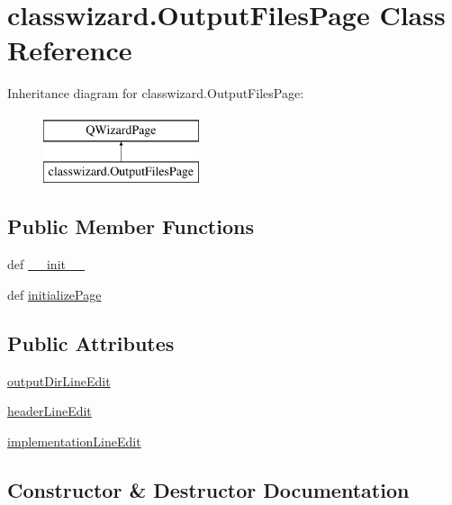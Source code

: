 \hypertarget{classclasswizard_1_1OutputFilesPage}{}\section{classwizard.\+Output\+Files\+Page Class Reference}
\label{classclasswizard_1_1OutputFilesPage}
Inheritance diagram for classwizard.\+Output\+Files\+Page\+:\begin{figure}[H]
\begin{center}
\leavevmode
\includegraphics[height=2.000000cm]{classclasswizard_1_1OutputFilesPage}
\end{center}
\end{figure}
\subsection*{Public Member Functions}
\begin{DoxyCompactItemize}
\item 
def \hyperlink{classclasswizard_1_1OutputFilesPage_a62190fa4f1f63361b802c6c979ab4219}{\+\_\+\+\_\+init\+\_\+\+\_\+}
\item 
def \hyperlink{classclasswizard_1_1OutputFilesPage_a03937d827ca14f5ab7d8fcd594fc55bd}{initialize\+Page}
\end{DoxyCompactItemize}
\subsection*{Public Attributes}
\begin{DoxyCompactItemize}
\item 
\hyperlink{classclasswizard_1_1OutputFilesPage_adaee735ccd60ca7113e40325b259e892}{output\+Dir\+Line\+Edit}
\item 
\hyperlink{classclasswizard_1_1OutputFilesPage_a4c16e5c9d4113a243c94ebdc74daaa68}{header\+Line\+Edit}
\item 
\hyperlink{classclasswizard_1_1OutputFilesPage_a8d2d292c1d2acdcf79292baf1ab63ff0}{implementation\+Line\+Edit}
\end{DoxyCompactItemize}


\subsection{Constructor \& Destructor Documentation}
\hypertarget{classclasswizard_1_1OutputFilesPage_a62190fa4f1f63361b802c6c979ab4219}{}
